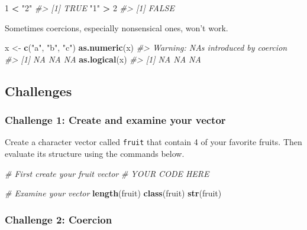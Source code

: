 \documentclass[]{book}
\newenvironment{Shaded}{\begin{snugshade}}{\end{snugshade}}
\newcommand{\KeywordTok}[1]{\textcolor[rgb]{0.13,0.29,0.53}{\textbf{#1}}}
\newcommand{\DecValTok}[1]{\textcolor[rgb]{0.00,0.00,0.81}{#1}}
\newcommand{\StringTok}[1]{\textcolor[rgb]{0.31,0.60,0.02}{#1}}
\newcommand{\CommentTok}[1]{\textcolor[rgb]{0.56,0.35,0.01}{\textit{#1}}}
\newcommand{\OperatorTok}[1]{\textcolor[rgb]{0.81,0.36,0.00}{\textbf{#1}}}
\newcommand{\NormalTok}[1]{#1}
\begin{document}
\begin{Shaded}
\begin{Highlighting}[]
\DecValTok{1} \OperatorTok{<}\StringTok{ "2"}
\CommentTok{#> [1] TRUE}
\StringTok{"1"} \OperatorTok{>}\StringTok{ }\DecValTok{2}
\CommentTok{#> [1] FALSE}
\end{Highlighting}
\end{Shaded}

Sometimes coercions, especially nonsensical ones, won't work.

\begin{Shaded}
\begin{Highlighting}[]
\NormalTok{x <-}\StringTok{ }\KeywordTok{c}\NormalTok{(}\StringTok{"a"}\NormalTok{, }\StringTok{"b"}\NormalTok{, }\StringTok{"c"}\NormalTok{)}
\KeywordTok{as.numeric}\NormalTok{(x)}
\CommentTok{#> Warning: NAs introduced by coercion}
\CommentTok{#> [1] NA NA NA}
\KeywordTok{as.logical}\NormalTok{(x)}
\CommentTok{#> [1] NA NA NA}
\end{Highlighting}
\end{Shaded}

\subsection{Challenges}\label{challenges-5}

\subsubsection*{Challenge 1: Create and examine your
vector}\label{challenge-1-create-and-examine-your-vector}

Create a character vector called \texttt{fruit} that contain 4 of your
favorite fruits. Then evaluate its structure using the commands below.

\begin{Shaded}
\begin{Highlighting}[]

\CommentTok{# First create your fruit vector }
\CommentTok{# YOUR CODE HERE}


\CommentTok{# Examine your vector}
\KeywordTok{length}\NormalTok{(fruit)}
\KeywordTok{class}\NormalTok{(fruit)}
\KeywordTok{str}\NormalTok{(fruit)}
\end{Highlighting}
\end{Shaded}

\subsubsection*{Challenge 2: Coercion}\label{challenge-2-coercion}
\end{document}
